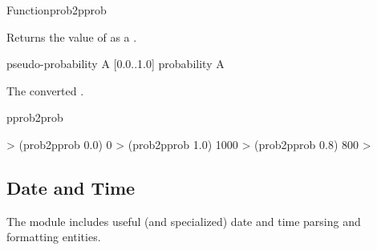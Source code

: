 \documentclass[10pt,twoside,english,pdftex]{article}
\begin{document}

\begin{functiondoc}{Function}{prob2pprob}%
  { \returns{} }
%
%

\fnsyntax

\fnpurpose Returns the value of  as a
.

\fnpackage {}

\fnmodule {}

\fnargs
\begin{args}{pseudo-probability}
\arg[probability] A [0.0..1.0] probability
 A  
\end{args}

\fnreturns The converted .

\begin{alsos}{pprob2prob}
\end{alsos}

\fnexamples
\begin{example}
%
\W\supp
  > (prob2pprob 0.0)
  0
  > (prob2pprob 1.0)
  1000
  > (prob2pprob 0.8)
  800
  > 
\end{example}

\end{functiondoc}


\T\markright{}%
\T\pagestyle{plain}
\T\clearpage
\W{}
\T\pagestyle{fancy}
\T\thispagestyle{fancybottom}
\T\global\def\fnlastname{ }%

\subsection{Date and Time}
\label{sec:dateandtime}%

%
The  module includes useful (and specialized) date and
time parsing and formatting entities.

\W\entities
\T\clearpage

\end{document}
